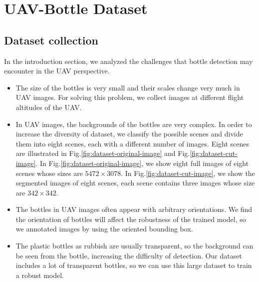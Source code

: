 \section{UAV-Bottle Dataset}
\label{sec:dataset}


\subsection{Dataset collection}
\label{ssec:image_collection}

In the introduction section, we analyzed the challenges that bottle detection may encounter in the UAV perspective.
\begin{itemize}
	\item The size of the bottles is very small and their scales change very much in UAV images. For solving this problem, we collect images at different flight altitudes of the UAV.
	
	\item In UAV images, the backgrounds of the bottles are very complex. In order to increase the diversity of dataset, we classify the possible scenes and divide them into eight scenes, each with a different number of images. Eight scenes are illustrated in Fig.\ref{fig:dataset-original-image} and Fig.\ref{fig:dataset-cut-image}. In Fig.\ref{fig:dataset-original-image}, we show eight full images of eight scenes whose sizes are $ 5472\times 3078 $. In Fig.\ref{fig:dataset-cut-image}, we show the segmented images of eight scenes, each scene contains three images whose size are $ 342 \times 342 $.
	
	\item The bottles in UAV images often appear with arbitrary orientations. We find the orientation of bottles will affect the robustness of the trained model, so we annotated images by using the oriented bounding box.
	
	\item The plastic bottles as rubbish are usually transparent, so the background can be seen from the bottle, increasing the difficulty of detection. Our dataset includes a lot of transparent bottles, so we can use this large dataset to train a robust model.
\end{itemize}
